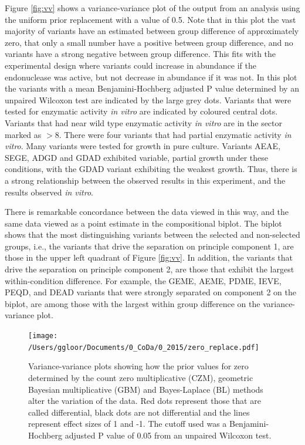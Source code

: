 \documentclass[article]{ajs}\usepackage[]{graphicx}\usepackage[]{color}
\begin{document}
Figure \ref{fig:vv} shows a variance-variance plot of the output from  an analysis using the uniform prior replacement with a value of 0.5. Note that in this plot the vast majority of variants have an estimated between group difference of approximately zero, that only a small number have a positive between group difference, and no variants have a strong negative between group difference. This fits with the experimental design where variants could increase in abundance if the endonuclease was active, but not decrease in abundance if it was not. In this plot the variants with a mean Benjamini-Hochberg adjusted P value determined by an unpaired Wilcoxon test are indicated by the large grey dots. Variants that were tested for enzymatic activity \emph{in vitro} are indicated by coloured central dots. Variants that had near wild type enzymatic activity \emph{in vitro} are in the sector marked as $>8$. There were four variants that had partial enzymatic activity \emph{in vitro}. Many variants were tested for growth in pure culture. Variants AEAE, SEGE, ADGD and GDAD exhibited variable, partial growth under these conditions, with the GDAD variant exhibiting the weakest growth. Thus, there is a strong relationship between the observed results in this experiment, and the results observed \emph{in vitro}.


There is remarkable concordance between the data viewed in this way, and the same data viewed as a point estimate in the compositional biplot. The biplot shows that the most distinguishing variants between the selected and non-selected groups, i.e., the variants that drive the separation on principle component 1, are those in the upper left quadrant of Figure \ref{fig:vv}. In addition, the variants that drive the separation on principle component 2, are those that exhibit the largest within-condition difference. For example, the GEME, AEME, PDME, IEVE, PEQD, and DEAD variants that were strongly separated on component 2 on the biplot, are among those with the largest within group difference on the variance-variance plot.

\begin{figure}[1ht]
\centerline{\texttt{[image: /Users/ggloor/Documents/0\_CoDa/0\_2015/zero\_replace.pdf]}}
\vspace{3mm} \caption{Variance-variance  plots showing how the prior values for zero determined by the count zero multiplicative (CZM), geometric Bayesian multiplicative (GBM) and Bayes-Laplace (BL) methods alter the variation of the data. Red dots represent those that are called differential, black dots are not differential and the lines represent effect sizes of 1 and -1. The cutoff used was a Benjamini-Hochberg adjusted P value of 0.05 from an unpaired Wilcoxon test.  }
\label{fig:replace}
\end{figure}
\end{document}

